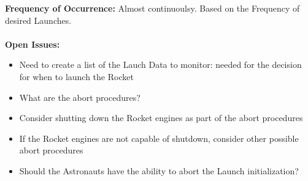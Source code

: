 \documentclass[letterpaper]{article}
\begin{document}
\textbf{Frequency of Occurrence:  }Almost continuoulsy.  Based on the
Frequency of desired Launches.\\\\
\textbf{Open Issues:  }
\begin{itemize}
\item Need to create a list of the Lauch Data to monitor:  needed for
the decision for when to launch the Rocket
\item What are the abort procedures?
\item Consider shutting down the Rocket engines as part of the abort
procedures
\item If the Rocket engines are not capable of shutdown, consider
other possible abort procedures
\item Should the Astronauts have the ability to abort the Launch
initialization?
\end{itemize}
\end{document}
